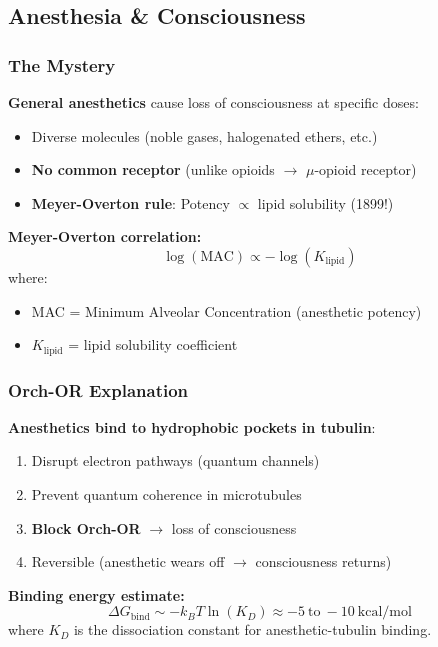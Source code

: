 \subsection{Anesthesia \& Consciousness}\label{anesthesia-consciousness}

\subsubsection{The Mystery}\label{the-mystery}

\textbf{General anesthetics} cause loss of consciousness at specific doses:
\begin{itemize}
\item Diverse molecules (noble gases, halogenated ethers, etc.)
\item \textbf{No common receptor} (unlike opioids $\rightarrow$ $\mu$-opioid receptor)
\item \textbf{Meyer-Overton rule}: Potency $\propto$ lipid solubility (1899!)
\end{itemize}

\textbf{Meyer-Overton correlation:}
\begin{equation}
\label{eq:meyer-overton}
\log(\text{MAC}) \propto -\log(K_{\text{lipid}})
\end{equation}
where:
\begin{itemize}
\item MAC = Minimum Alveolar Concentration (anesthetic potency)
\item $K_{\text{lipid}}$ = lipid solubility coefficient
\end{itemize}

\subsubsection{Orch-OR Explanation}\label{orch-or-explanation}

\textbf{Anesthetics bind to hydrophobic pockets in tubulin}:
\begin{enumerate}
\item Disrupt electron pathways (quantum channels)
\item Prevent quantum coherence in microtubules
\item \textbf{Block Orch-OR} $\rightarrow$ loss of consciousness
\item Reversible (anesthetic wears off $\rightarrow$ consciousness returns)
\end{enumerate}

\textbf{Binding energy estimate:}
\begin{equation}
\label{eq:anesthetic-binding}
\Delta G_{\text{bind}} \sim -k_B T \ln(K_D) \approx -5~\text{to}~-10~\text{kcal/mol}
\end{equation}
where $K_D$ is the dissociation constant for anesthetic-tubulin binding.

